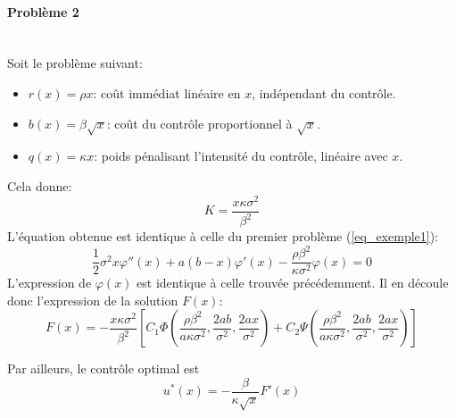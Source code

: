 \paragraph{Problème 2}\label{p2}\phantom{}\\
\noindent Soit le problème suivant: 
\begin{itemize}
    \item $r(x) = \rho x$: coût immédiat linéaire en $x$, indépendant du contrôle.
    \item $b(x) = \beta \sqrt{x}$: coût du contrôle proportionnel à $\sqrt{x}$.
    \item $q(x) = \kappa x$: poids pénalisant l'intensité du contrôle, linéaire avec $x$.
\end{itemize}
Cela donne: 
\[
K=\frac{x\kappa \sigma^2}{\beta^2}
\]
L'équation obtenue est identique à celle du premier problème (\ref{eq_exemple1}): 
\[
\frac{1}{2}\sigma^2 x\varphi''(x) + a(b - x)\varphi'(x) - \frac{\rho\beta^2}{\kappa \sigma^2}\varphi(x) = 0
\]
L'expression de $\varphi(x)$ est identique à celle trouvée précédemment. Il en découle donc l'expression de la solution $F(x)$: 
\begin{equation}\label{sol_control_2}
    F(x)=-\frac{x\kappa \sigma^2}{\beta^2}\left[C_1\Phi\left(\frac{\rho\beta^2}{a\kappa \sigma^2},\frac{2ab}{\sigma^2},\frac{2ax}{\sigma^2}\right) + C_2\Psi\left(\frac{\rho\beta^2}{a\kappa \sigma^2},\frac{2ab}{\sigma^2},\frac{2ax}{\sigma^2}\right)\right]
\end{equation}

Par ailleurs, le contrôle optimal est
\begin{equation}\label{optimal_control_2}
    u^*(x)=-\frac{\beta}{\kappa\sqrt{x}}F'(x)
\end{equation}

